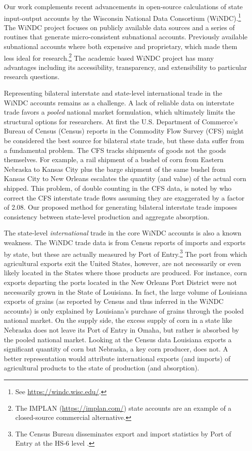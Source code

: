 \documentclass{ejb}
\begin{document}
Our work complements recent advancements in open-source calculations
of state input-output accounts by the Wisconsin National Data
Consortium (WiNDC).\footnote{See \url{https://windc.wisc.edu/}.}
The WiNDC project focuses on publicly available data sources and a
series of routines that generate micro-consistent subnational
accounts.  Previously available subnational accounts where both
expensive and proprietary, which made them less ideal for
research.\footnote{The IMPLAN (\url{https://implan.com/}) state
	accounts are an example of a closed-source commercial
	alternative.}
The academic based WiNDC project has many advantages including its
accessibility, transparency, and extensibility to particular research
questions.  

Representing bilateral interstate and state-level international trade
in the WiNDC accounts remains as a challenge. A lack of reliable data 
on interstate trade favors a \emph{pooled} national market
formulation, which ultimately limits the structural options for
researchers.  At first the U.S. Department of Commerce's Bureau of
Census (Census) reports in the Commodity Flow Survey (CFS) might be
considered the best source for bilateral state trade, but these data
suffer from a fundamental problem.  The CFS tracks shipments of goods not
the goods themselves.  For example, a rail shipment of a bushel of
corn from Eastern Nebraska to Kansas City plus the barge shipment of the
same bushel from Kansas City to New Orleans escalates the quantity
(and value) of the actual corn shipped.  This problem, of double
counting in the CFS data, is noted by \citet{AvW} who
correct the CFS interstate trade flows assuming they are exaggerated
by a factor of 2.08.  Our proposed method for generating bilateral
interstate trade imposes consistency between state-level production
and aggregate absorption. 

The state-level \emph{international} trade in the core WiNDC accounts is also
a known weakness.  The WiNDC trade data is from Census
reports of imports and exports by state, but these are actually
measured by Port of Entry.\footnote{The Census Bureau 
	disseminates export and import statistics by Port of Entry at
	the HS-6 level \citep{Census}.}  
The port from which agricultural exports exit the United States,
however, are not necessarily or even likely located in the States where
those products are produced.  For instance, corn exports departing the
ports located in the New Orleans Port District were not necessarily
grown in the State of Louisiana.  In fact, the large volume of
Louisiana exports of grains (as reported by Census and thus inferred
in the WiNDC accounts) is only explained by Louisiana's purchase of
grains through the pooled national market.  On the supply side, the
excess supply of corn in a state like Nebraska does not leave its Port
of Entry in Omaha, but rather is absorbed by the pooled national
market.  Looking at the Census data Louisiana exports a significant
quantity of corn but Nebraska, a key corn producer, does not.  A
better representation would attribute international exports (and
imports) of agricultural products to the state of production (and
absorption).  
 
\end{document}
